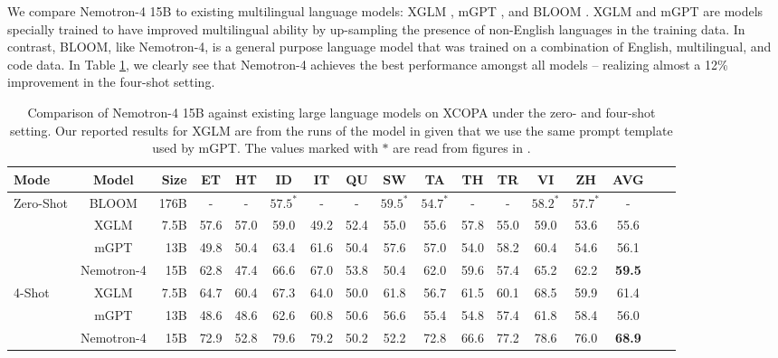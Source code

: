 \documentclass[11pt]{article}
\newcommand{\shrimai}[1]{{\color{red}{\textbf{Shrimai}: #1}}}
\newcommand{\ours}{Nemotron-4}
\begin{document}
We compare \ours{} 15B to existing multilingual language models: XGLM \citep{lin2022fewshot} , mGPT \citep{shliazhko2022mgpt}, and BLOOM \citep{workshop2023bloom}. 
XGLM and mGPT are models specially trained to have improved multilingual ability by up-sampling the presence of non-English languages in the training data. 
In contrast, BLOOM, like \ours{}, is a general purpose language model that was trained on a combination of English, multilingual, and code data. 
In Table \ref{tab:xcopa}, we clearly see that \ours{} achieves the best performance amongst all models -- realizing almost a 12\% improvement in the four-shot setting. 



\begin{table}[H]
\centering
\begin{adjustbox}{max width=\textwidth, scale=1.0}
\begin{tabular}{lcrcccccccccccccc}
\toprule
Mode & Model & Size & ET & HT & ID & IT  & QU & SW & TA  & TH & TR & VI & ZH & AVG \\
\midrule
 \multirow{4}{*}{Zero-Shot} & BLOOM &   176B & - & - &  $57.5^*$ &	- &	 -  &	$59.5^*$ &	 $54.7^*$ &	- &	- &  $58.2^*$ &  $57.7^*$ & -     \\
 & XGLM & 7.5B & 57.6	& 57.0	& 59.0 &	49.2 &	52.4&	55.0 &	55.6	& 57.8& 	55.0 &	59.0 &	53.6 &	55.6 \\
 & mGPT &   13B & 49.8 &	50.4	& 63.4	& 61.6	& 50.4	& 57.6 &	57.0 & 54.0 &	58.2	& 60.4	& 54.6 & 56.1  \\
  & \ours{} & 15B & 62.8 & 47.4 & 66.6 & 67.0 & 53.8 & 50.4 & 62.0 & 59.6 & 57.4 & 65.2 & 62.2 & \textbf{59.5}   \\
  \midrule
\multirow{3}{*}{4-Shot} & XGLM &   7.5B & 64.7	&60.4	&67.3	& 64.0&	50.0&	61.8&	56.7&	61.5&	60.1 &	68.5 & 59.9	& 61.4   \\
 & mGPT & 13B & 48.6&	48.6	&62.6&	60.8&	50.6&	56.6&	55.4&	54.8&	57.4	&61.8&	58.4&56.0            \\
 & \ours{} & 15B & 72.9 & 52.8 & 79.6 & 79.2 & 50.2 & 52.2 & 72.8 & 66.6 & 77.2 & 78.6 & 76.0 & \textbf{68.9}  \\
\bottomrule
\end{tabular}
\end{adjustbox}
\caption{\label{tab:xcopa} Comparison of \ours{} 15B against existing large language models on XCOPA under the zero- and four-shot setting. Our reported results for XGLM are from the runs of the model in \citep{shliazhko2022mgpt} given that we use the same prompt template used by mGPT. The values marked with $*$ are read from figures in \citep{workshop2023bloom}. %
}
\end{table}
\end{document}
